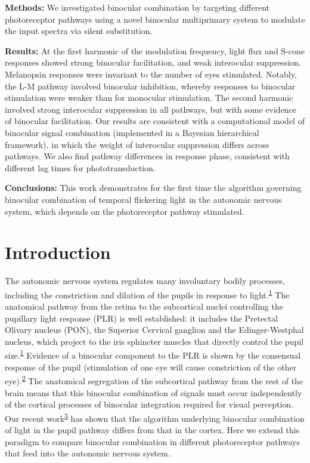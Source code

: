 \documentclass[
]{article}
\begin{document}
\textbf{Methods:} We investigated binocular combination by targeting different photoreceptor pathways using a novel binocular multiprimary system to modulate the input spectra via silent substitution.

\textbf{Results:} At the first harmonic of the modulation frequency, light flux and S-cone responses showed strong binocular facilitation, and weak interocular suppression. Melanopsin responses were invariant to the number of eyes stimulated. Notably, the L-M pathway involved binocular inhibition, whereby responses to binocular stimulation were weaker than for monocular stimulation. The second harmonic involved strong interocular suppression in all pathways, but with some evidence of binocular facilitation. Our results are consistent with a computational model of binocular signal combination (implemented in a Bayesian hierarchical framework), in which the weight of interocular suppression differs across pathways. We also find pathway differences in response phase, consistent with different lag times for phototransduction.

\textbf{Conclusions:} This work demonstrates for the first time the algorithm governing binocular combination of temporal flickering light in the autonomic nervous system, which depends on the photoreceptor pathway stimulated.

\hypertarget{introduction}{%
\section{Introduction}\label{introduction}}

The autonomic nervous system regulates many involuntary bodily processes, including the constriction and dilation of the pupils in response to light.\textsuperscript{\protect\hyperlink{ref-McDougal2015}{1}} The anatomical pathway from the retina to the subcortical nuclei controlling the pupillary light response (PLR) is well established: it includes the Pretectal Olivary nucleus (PON), the Superior Cervical ganglion and the Edinger-Westphal nucleus, which project to the iris sphincter muscles that directly control the pupil size.\textsuperscript{\protect\hyperlink{ref-McDougal2015}{1}} Evidence of a binocular component to the PLR is shown by the consensual response of the pupil (stimulation of one eye will cause constriction of the other eye).\textsuperscript{\protect\hyperlink{ref-Wyatt1981}{2}} The anatomical segregation of the subcortical pathway from the rest of the brain means that this binocular combination of signals must occur independently of the cortical processes of binocular integration required for visual perception. Our recent work\textsuperscript{\protect\hyperlink{ref-Segala2023}{3}} has shown that the algorithm underlying binocular combination of light in the pupil pathway differs from that in the cortex. Here we extend this paradigm to compare binocular combination in different photoreceptor pathways that feed into the autonomic nervous system.
\end{document}
